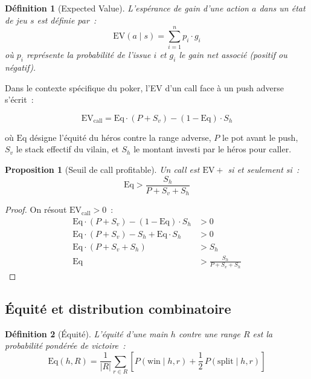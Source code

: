 \documentclass[a4paper,11pt]{article}
\newtheorem{definition}{D\'efinition}[section]
\newtheorem{proposition}{Proposition}[section]
\newcommand{\EV}{\mathrm{EV}}
\newcommand{\Eq}{\mathrm{Eq}}
\begin{document}
\begin{definition}[Expected Value]
L'esp\'erance de gain d'une action $a$ dans un \'etat de jeu $s$ est d\'efinie par~:
\begin{equation}
\EV(a \mid s) = \sum_{i=1}^{n} p_i \cdot g_i
\end{equation}
o\`u $p_i$ repr\'esente la probabilit\'e de l'issue $i$ et $g_i$ le gain net associ\'e (positif ou n\'egatif).
\end{definition}

Dans le contexte sp\'ecifique du poker, l'EV d'un call face \`a un push adverse s'\'ecrit~:

\begin{equation}
\EV_{\text{call}} = \Eq \cdot (P + S_v) - (1 - \Eq) \cdot S_h
\label{eq:ev_call}
\end{equation}

o\`u $\Eq$ d\'esigne l'\'equit\'e du h\'eros contre la range adverse, $P$ le pot avant le push, $S_v$ le stack effectif du vilain, et $S_h$ le montant investi par le h\'eros pour caller.

\begin{proposition}[Seuil de call profitable]
Un call est $\EV+$ si et seulement si~:
\begin{equation}
\Eq > \frac{S_h}{P + S_v + S_h}
\label{eq:seuil_call}
\end{equation}
\end{proposition}

\begin{proof}
On r\'esout $\EV_{\text{call}} > 0$~:
\begin{align}
\Eq \cdot (P + S_v) - (1 - \Eq) \cdot S_h &> 0 \\
\Eq \cdot (P + S_v) - S_h + \Eq \cdot S_h &> 0 \\
\Eq \cdot (P + S_v + S_h) &> S_h \\
\Eq &> \frac{S_h}{P + S_v + S_h}
\end{align}
\end{proof}

\subsection{\'Equit\'e et distribution combinatoire}

\begin{definition}[\'Equit\'e]
L'\'equit\'e d'une main $h$ contre une range $R$ est la probabilit\'e pond\'er\'ee de victoire~:
\begin{equation}
\Eq(h, R) = \frac{1}{|R|} \sum_{r \in R} \left[ P(\text{win} \mid h, r) + \frac{1}{2}\,P(\text{split} \mid h, r) \right]
\end{equation}
\end{definition}
\end{document}
